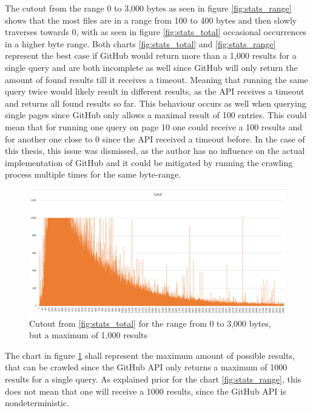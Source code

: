 The cutout from the range 0 to 3,000 bytes as seen in figure \ref{fig:stats_range} shows that the most files are in a range from 100 to 400 bytes and then slowly traverses towards 0, with as seen in figure \ref{fig:stats_total} occasional occurrences in a higher byte range. Both charts \ref{fig:stats_total} and \ref{fig:stats_range} represent the best case if GitHub would return more than a 1,000 results for a single query and are both incomplete as well since GitHub will only return the amount of found results till it receives a timeout. Meaning that running the same query twice would likely result in different results, as the API receives a timeout and returns all found results so far. This behaviour occurs as well when querying single pages since GitHub only allows a maximal result of 100 entries. This could mean that for running one query on page 10 one could receive a 100 results and for another one close to 0 since the API received a timeout before. In the case of this thesis, this issue was dismissed, as the author has no influence on the actual implementation of GitHub and it could be mitigated by running the crawling process multiple times for the same byte-range.

\begin{figure}[H]
    \centering
    \includegraphics[scale=0.5]{graphics/stats_range_max_possible.png}
    \caption{Cutout from \ref{fig:stats_total} for the range from 0 to 3,000 bytes, but a maximum of 1,000 results }
    \label{fig:stats_max_possible}
\end{figure}

The chart in figure \ref{fig:stats_max_possible} shall represent the maximum amount of possible results, that can be crawled since the GitHub API only returns a maximum of 1000 results for a single query. As explained prior for the chart \ref{fig:stats_range}, this does not mean that one will receive a 1000 results, since the GitHub API is nondeterministic.

